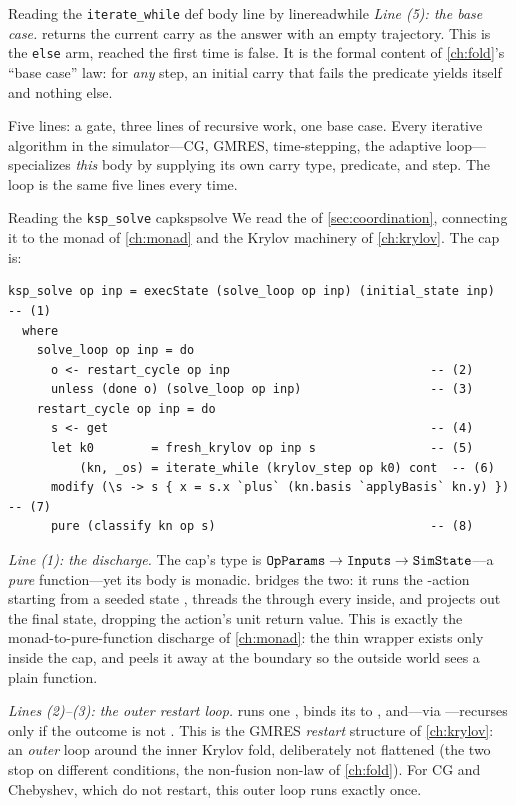 \begin{workedexample}{Reading the \texttt{iterate\_while} def body line by line}{readwhile}
\emph{Line (5): the base case.} 
returns the current carry as the answer with an empty trajectory. This is the
\texttt{else} arm, reached the first time  is false. It is the formal
content of \cref{ch:fold}'s ``base case'' law: for \emph{any} step, an initial
carry that fails the predicate yields itself and nothing else.

Five lines: a gate, three lines of recursive work, one base case. Every iterative
algorithm in the simulator---CG, GMRES, time-stepping, the adaptive
loop---specializes \emph{this} body by supplying its own carry type, predicate, and
step. The loop is the same five lines every time.
\end{workedexample}

\begin{workedexample}{Reading the \texttt{ksp\_solve} cap}{kspsolve}
We read the  of \cref{sec:coordination}, connecting it to the monad
of \cref{ch:monad} and the Krylov machinery of \cref{ch:krylov}. The cap is:
\begin{lstlisting}[style=l4style]
ksp_solve op inp = execState (solve_loop op inp) (initial_state inp)  -- (1)
  where
    solve_loop op inp = do
      o <- restart_cycle op inp                            -- (2)
      unless (done o) (solve_loop op inp)                  -- (3)
    restart_cycle op inp = do
      s <- get                                             -- (4)
      let k0        = fresh_krylov op inp s                -- (5)
          (kn, _os) = iterate_while (krylov_step op k0) cont  -- (6)
      modify (\s -> s { x = s.x `plus` (kn.basis `applyBasis` kn.y) })  -- (7)
      pure (classify kn op s)                              -- (8)
\end{lstlisting}

\emph{Line (1): the  discharge.} The cap's type is
$\texttt{OpParams}\to\texttt{Inputs}\to\texttt{SimState}$---a \emph{pure} function---yet
its body is monadic.  bridges the two: it runs the
-action  starting from a seeded state
, threads the  through every 
inside, and projects out the final state, dropping the action's unit return value.
This is exactly the monad-to-pure-function discharge of \cref{ch:monad}: the thin
 wrapper exists only inside the cap, and  peels it
away at the boundary so the outside world sees a plain function.

\emph{Lines (2)--(3): the outer restart loop.}  runs one
, binds its  to , and---via
---recurses only if the outcome is not . This is
the GMRES \emph{restart} structure of \cref{ch:krylov}: an \emph{outer} loop around
the inner Krylov fold, deliberately not flattened (the two stop on different
conditions, the non-fusion non-law of \cref{ch:fold}). For CG and Chebyshev, which
do not restart, this outer loop runs exactly once.


\end{workedexample}
